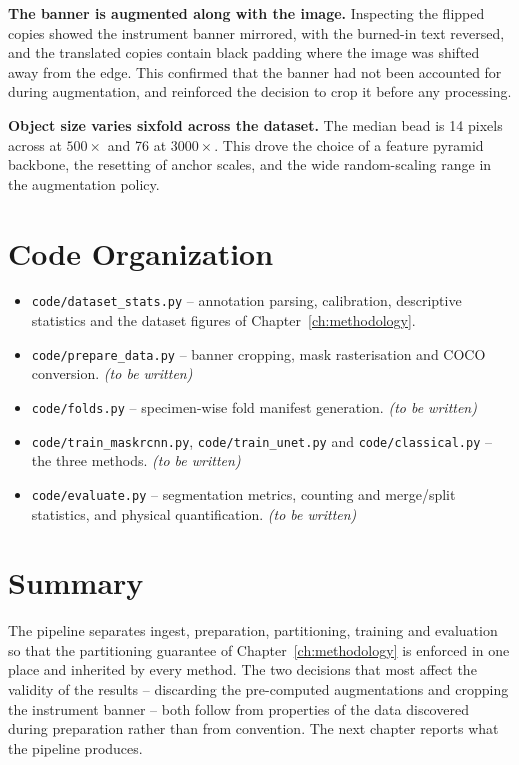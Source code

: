 \textbf{The banner is augmented along with the image.} Inspecting the flipped copies
showed the instrument banner mirrored, with the burned-in text reversed, and the
translated copies contain black padding where the image was shifted away from the
edge. This confirmed that the banner had not been accounted for during augmentation,
and reinforced the decision to crop it before any processing.

\textbf{Object size varies sixfold across the dataset.} The median bead is 14 pixels
across at $500\times$ and 76 at $3000\times$. This drove the choice of a feature
pyramid backbone, the resetting of anchor scales, and the wide random-scaling range
in the augmentation policy.

\section{Code Organization}

\begin{itemize}
    \item \texttt{code/dataset\_stats.py} -- annotation parsing, calibration,
    descriptive statistics and the dataset figures of Chapter~\ref{ch:methodology}.
    \item \texttt{code/prepare\_data.py} -- banner cropping, mask rasterisation and
    COCO conversion. \textit{(to be written)}
    \item \texttt{code/folds.py} -- specimen-wise fold manifest generation.
    \textit{(to be written)}
    \item \texttt{code/train\_maskrcnn.py}, \texttt{code/train\_unet.py} and
    \texttt{code/classical.py} -- the three methods. \textit{(to be written)}
    \item \texttt{code/evaluate.py} -- segmentation metrics, counting and merge/split
    statistics, and physical quantification. \textit{(to be written)}
\end{itemize}

\section{Summary}

The pipeline separates ingest, preparation, partitioning, training and evaluation so
that the partitioning guarantee of Chapter~\ref{ch:methodology} is enforced in one
place and inherited by every method. The two decisions that most affect the validity
of the results -- discarding the pre-computed augmentations and cropping the
instrument banner -- both follow from properties of the data discovered during
preparation rather than from convention. The next chapter reports what the pipeline
produces.
